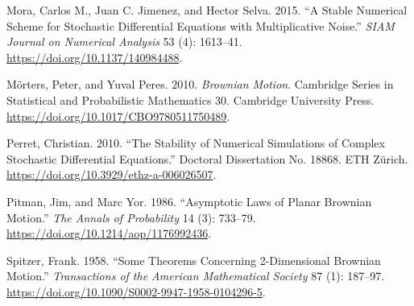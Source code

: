 \documentclass[
  english,
  10pt,
  letterpaper,
  DIV=11,
  numbers=noendperiod]{scrartcl}
\newlength{\cslhangindent}
\newenvironment{CSLReferences}[2] %
 {\begin{list}{}{%
  \setlength{\itemindent}{0pt}
  \setlength{\leftmargin}{0pt}
  \setlength{\parsep}{0pt}
  \ifodd #1
   \setlength{\leftmargin}{\cslhangindent}
   \setlength{\itemindent}{-1\cslhangindent}
  \fi
  \setlength{\itemsep}{#2\baselineskip}}}
 {\end{list}}
\begin{document}
\begin{CSLReferences}{1}{1}
Mora, Carlos M., Juan C. Jimenez, and Hector Selva. 2015. {``A Stable
Numerical Scheme for Stochastic Differential Equations with
Multiplicative Noise.''} \emph{SIAM Journal on Numerical Analysis} 53
(4): 1613--41. \url{https://doi.org/10.1137/140984488}.

Mörters, Peter, and Yuval Peres. 2010. \emph{Brownian Motion}. Cambridge
Series in Statistical and Probabilistic Mathematics 30. Cambridge
University Press. \url{https://doi.org/10.1017/CBO9780511750489}.

Perret, Christian. 2010. {``The Stability of Numerical Simulations of
Complex Stochastic Differential Equations.''} Doctoral Dissertation No.
18868. ETH Z{ü}rich. \url{https://doi.org/10.3929/ethz-a-006026507}.

Pitman, Jim, and Marc Yor. 1986. {``Asymptotic Laws of Planar Brownian
Motion.''} \emph{The Annals of Probability} 14 (3): 733--79.
\url{https://doi.org/10.1214/aop/1176992436}.

Spitzer, Frank. 1958. {``Some Theorems Concerning 2-Dimensional Brownian
Motion.''} \emph{Transactions of the American Mathematical Society} 87
(1): 187--97. \url{https://doi.org/10.1090/S0002-9947-1958-0104296-5}.

\end{CSLReferences}
\end{document}
